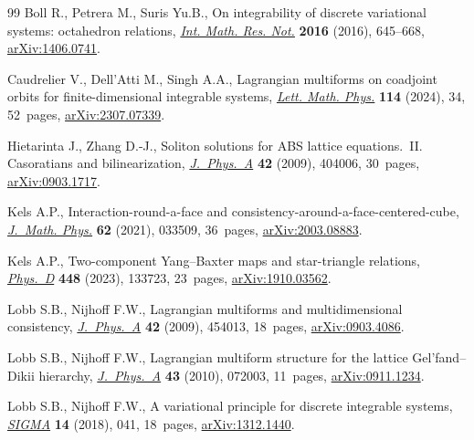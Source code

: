 \documentclass[10pt,a4paper]{amsart}
\numberwithin{equation}{section}
\begin{document}
\begin{thebibliography}{99}
Boll R., Petrera M., Suris Yu.B., On integrability of discrete variational
 systems: octahedron relations,
 \href{https://doi.org/10.1093/imrn/rnv140}{\textit{Int. Math. Res. Not.}} \textbf{2016} (2016), 645--668,
 \href{http://arxiv.org/abs/1406.0741}{arXiv:1406.0741}.

Caudrelier V., Dell'Atti M., Singh A.A., Lagrangian multiforms on coadjoint
 orbits for finite-dimensional integrable systems,
 \href{https://doi.org/10.1007/s11005-023-01766-9}{\textit{Lett. Math. Phys.}}
 \textbf{114} (2024), 34, 52~pages,
 \href{http://arxiv.org/abs/2307.07339}{arXiv:2307.07339}.

Hietarinta J., Zhang D.-J., Soliton solutions for {ABS} lattice equations.~{II}.
 {C}asoratians and bilinearization,
 \href{https://doi.org/10.1088/1751-8113/42/40/404006}{\textit{J.~Phys.~A}}
 \textbf{42} (2009), 404006, 30~pages,
 \href{http://arxiv.org/abs/0903.1717}{arXiv:0903.1717}.

Kels A.P., Interaction-round-a-face and
 consistency-around-a-face-centered-cube,
 \href{https://doi.org/10.1063/5.0024630}{\textit{J.~Math. Phys.}} \textbf{62}
 (2021), 033509, 36~pages,
 \href{http://arxiv.org/abs/2003.08883}{arXiv:2003.08883}.

Kels A.P., Two-component {Y}ang--{B}axter maps and star-triangle relations,
 \href{https://doi.org/10.1016/j.physd.2023.133723}{\textit{Phys.~D}}
 \textbf{448} (2023), 133723, 23~pages,
 \href{http://arxiv.org/abs/1910.03562}{arXiv:1910.03562}.

Lobb S.B., Nijhoff F.W., Lagrangian multiforms and multidimensional
 consistency,
 \href{https://doi.org/10.1088/1751-8113/42/45/454013}{\textit{J.~Phys.~A}}
 \textbf{42} (2009), 454013, 18~pages,
 \href{http://arxiv.org/abs/0903.4086}{arXiv:0903.4086}.

Lobb S.B., Nijhoff F.W., Lagrangian multiform structure for the lattice
 {G}el'fand--{D}ikii hierarchy,
 \href{https://doi.org/10.1088/1751-8113/43/7/072003}{\textit{J.~Phys.~A}}
 \textbf{43} (2010), 072003, 11~pages,
 \href{http://arxiv.org/abs/0911.1234}{arXiv:0911.1234}.

Lobb S.B., Nijhoff F.W., A variational principle for discrete integrable
 systems, \href{https://doi.org/10.3842/SIGMA.2018.041}{\textit{SIGMA}}
 \textbf{14} (2018), 041, 18~pages,
 \href{http://arxiv.org/abs/1312.1440}{arXiv:1312.1440}.


\end{thebibliography}
\end{document}
